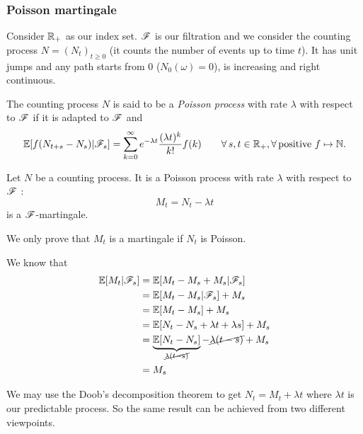 \documentclass{report}
\begin{document}
\subsubsection*{Poisson martingale}
Consider $\mathbb{R}_{+}$ as our index set. $\mathscr{F}$ is our filtration and we consider the counting process $N={(N_{t})}_{t\geq 0}$ (it counts the number of events up to time $t$). It has unit jumps and any path starts from 0 ($N_0(\omega)=0$), is increasing and right continuous.
\begin{definition}
	The counting process $N$ is said to be a \emph{Poisson process} with rate $\lambda$ with respect to $\mathscr{F}$ if it is adapted to $\mathscr{F}$ and
	\[\mathbb{E}[f(N_{t+s}-N_s)|\mathscr{F}_s]=\sum_{k=0}^{\infty}e^{-\lambda t}\frac{(\lambda t)^{k}}{k!}f(k)\qquad\forall\, s,t\in\mathbb{R}_+,\forall\,\text{positive }f\mapsto\mathbb{N}.\]
\end{definition}
\begin{theorem}
	Let $N$ be a counting process. It is a Poisson process with rate $\lambda$ with respect to $\mathscr{F}$ \ifonly{}:
	\begin{equation*}
		M_{t}=N_{t}-\lambda t
	\end{equation*}
	is a $\mathscr{F}$-martingale.
\end{theorem}
We only prove that $M_t$ is a martingale if $N_{t}$ is Poisson.
\begin{fancyproof}
	We know that 
	\begin{align*}
		\mathbb{E}[M_{t}|\mathscr{F}_{s}]&=\mathbb{E}[M_{t}-M_{s}+M_{s}|\mathscr{F}_{s}]\\
		&=\mathbb{E}[M_{t}-M_{s}|\mathscr{F}_{s}]+M_{s}\\
		&=\mathbb{E}[M_{t}-M_{s}]+M_{s}\\
		&=\mathbb{E}[N_{t}-N_{s}+\lambda t+\lambda s]+M_{s}\\
		&=\underbrace{\mathbb{E}[N_{t}-N_{s}]}_{\cancel{\lambda (t-s)}}-\cancel{\lambda (t-s)}+M_{s}\\
		&=M_{s}
	\end{align*}
\end{fancyproof}
We may use the Doob's decomposition theorem to get $N_{t}=M_{t}+\lambda t$ where $\lambda t$ is our predictable process. So the same result can be achieved from two different viewpoints.
\end{document}
